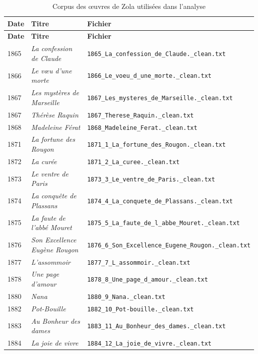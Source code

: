 \begin{longtable}{p{1.6cm}p{4.2cm}p{8cm}}
\caption{Corpus des œuvres de Zola utilisées dans l'analyse}\\
\toprule
\textbf{Date} & \textbf{Titre} & \textbf{Fichier} \\
\midrule
\endfirsthead

\toprule
\textbf{Date} & \textbf{Titre} & \textbf{Fichier} \\
\midrule
\endhead

1865 & \textit{La confession de Claude} & \texttt{1865\_La\_confession\_de\_Claude.\_clean.txt} \\
1866 & \textit{Le vœu d'une morte} & \texttt{1866\_Le\_voeu\_d\_une\_morte.\_clean.txt} \\
1867 & \textit{Les mystères de Marseille} & \texttt{1867\_Les\_mysteres\_de\_Marseille.\_clean.txt} \\
1867 & \textit{Thérèse Raquin} & \texttt{1867\_Therese\_Raquin.\_clean.txt} \\
1868 & \textit{Madeleine Férat} & \texttt{1868\_Madeleine\_Ferat.\_clean.txt} \\
1871 & \textit{La fortune des Rougon} & \texttt{1871\_1\_La\_fortune\_des\_Rougon.\_clean.txt} \\
1872 & \textit{La curée} & \texttt{1871\_2\_La\_curee.\_clean.txt} \\
1873 & \textit{Le ventre de Paris} & \texttt{1873\_3\_Le\_ventre\_de\_Paris.\_clean.txt} \\
1874 & \textit{La conquête de Plassans} & \texttt{1874\_4\_La\_conquete\_de\_Plassans.\_clean.txt} \\
1875 & \textit{La faute de l'abbé Mouret} & \texttt{1875\_5\_La\_faute\_de\_l\_abbe\_Mouret.\_clean.txt} \\
1876 & \textit{Son Excellence Eugène Rougon} & \texttt{1876\_6\_Son\_Excellence\_Eugene\_Rougon.\_clean.txt} \\
1877 & \textit{L'assommoir} & \texttt{1877\_7\_L\_assommoir.\_clean.txt} \\
1878 & \textit{Une page d'amour} & \texttt{1878\_8\_Une\_page\_d\_amour.\_clean.txt} \\
1880 & \textit{Nana} & \texttt{1880\_9\_Nana.\_clean.txt} \\
1882 & \textit{Pot-Bouille} & \texttt{1882\_10\_Pot-bouille.\_clean.txt} \\
1883 & \textit{Au Bonheur des dames} & \texttt{1883\_11\_Au\_Bonheur\_des\_dames.\_clean.txt} \\
1884 & \textit{La joie de vivre} & \texttt{1884\_12\_La\_joie\_de\_vivre.\_clean.txt} \\

\end{longtable}
